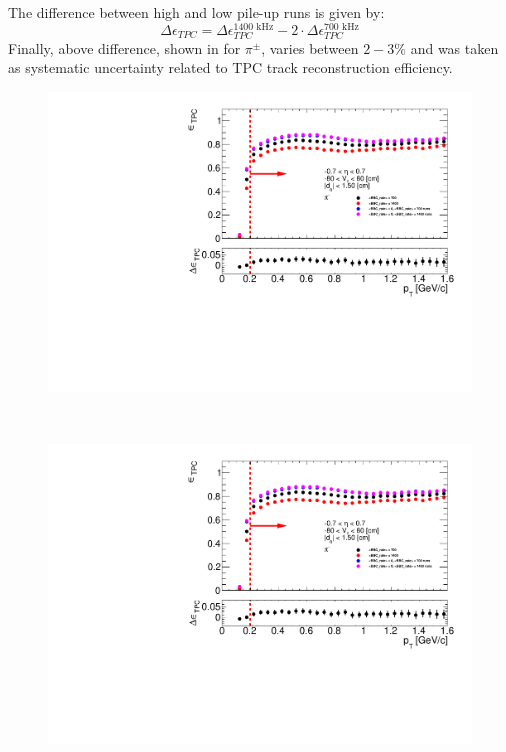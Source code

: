 The difference between high and low pile-up runs is given by:
\begin{equation}
\Delta\epsilon_{ TPC} =\Delta\epsilon_{ TPC}^{1400\text{ kHz}}-2\cdot\Delta\epsilon_{ TPC}^{700\text{ kHz}}
\label{eq:tpcSystDifference}
\end{equation}
Finally, above difference, shown in   for $\pi^\pm$, varies between $2-3\%$ and was taken as systematic uncertainty related to TPC track reconstruction efficiency.
\begin{figure}[hb]
	\centering
	\parbox{0.495\textwidth}{
		\centering
		\includegraphics[width=\linewidth,page=1]{graphics/systematicsEfficiency/bbc_and/tpcEffi_d0_1_5_etapt_1.pdf}\\
	}~
	\parbox{0.495\textwidth}{
		\centering
		\includegraphics[width=\linewidth,page=2]{graphics/systematicsEfficiency/bbc_and/tpcEffi_d0_1_5_etapt_1.pdf}\\
}
\end{figure}

